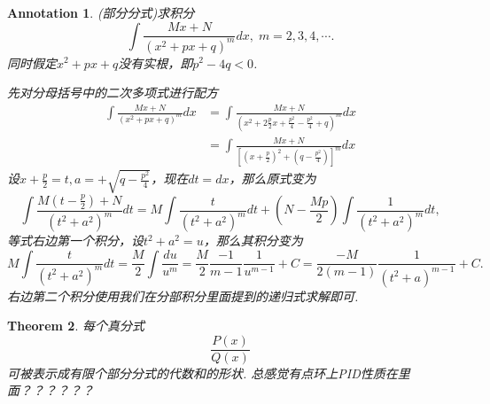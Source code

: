 \documentclass{article}
\newtheorem{theorem}{Theorem}[section]
\newtheorem{annotation}[theorem]{Annotation}
\begin{document}
\begin{annotation}
\rm {\color{red}(部分分式)}求积分
$$
\int \frac{Mx+N}{(x^2+px+q)^m}dx,\; m = 2,3,4,\cdots.
$$
同时假定$x^2+px+q$没有实根，即$p^2 - 4q < 0$.

先对分母括号中的二次多项式进行配方
$$
\begin{array}{ll}
\int \frac{Mx+N}{(x^2+px+q)^m}dx &= \int \frac{Mx+N}{(x^2+2\frac{p}{2}x+\frac{p^2}{4}-\frac{p^2}{4}+q)^m}dx\\
&= \int \frac{Mx+N}{\left[(x+\frac{p}{2})^2+(q-\frac{p^2}{4})\right]^m}dx
\end{array}
$$
设$x+\frac{p}{2} = t, a = + \sqrt{q-\frac{p^2}{4}}$，现在$dt=dx$，那么原式变为
$$
\int \frac{M(t-\frac{p}{2})+N}{\left(t^2+a^2\right)^m}dt = M\int \frac{t}{\left(t^2+a^2\right)^m}dt + (N-\frac{Mp}{2})\int \frac{1}{\left(t^2+a^2\right)^m}dt,
$$
等式右边第一个积分，设$t^2+a^2 = u$，那么其积分变为
$$
M\int \frac{t}{\left(t^2+a^2\right)^m}dt = \frac{M}{2} \int  \frac{du}{u^m} = \frac{M}{2} \frac{-1}{m-1}\frac{1}{u^{m-1}} + C = \frac{-M}{2(m-1)}\frac{1}{(t^2+a)^{m-1}}+C.
$$
右边第二个积分使用我们在分部积分里面提到的{\color{blue}递归式求解}即可. 
\end{annotation}

\begin{theorem}
\rm 每个真分式
$$
\frac{P(x)}{Q(x)}
$$
可被表示成{\color{red}有限个部分分式的代数和}的形状. {\color{blue}总感觉有点环上PID性质在里面？？？？？？}
\end{theorem}
\end{document}
